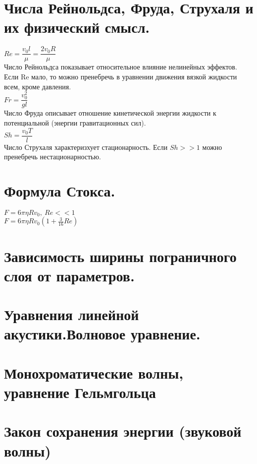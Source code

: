 \begin{multicols*}{4}
		\section{Числа Рейнольдса, Фруда, Струхаля и их физический смысл.}
		$Re=\dfrac{v_0l}{\mu}=\dfrac{2v_0R}{\mu}$ \\
		Число Рейнольдса показывает относительное влияние нелинейных эффектов. Если Re мало, то можно пренебречь в уравнении движения вязкой жидкости всем, кроме давления. \\
		$Fr=\dfrac{v_0^2}{gl}$ \\
		Число Фруда описывает отношение кинетической энергии жидкости к потенциальной (энергии гравитационных сил). \\
		$Sh=\dfrac{v_0T}{l}$ \\
		Число Струхаля характеризхует стационарность. Если $Sh >> 1$ можно пренебречь нестационарностью.
		
		\section{Формула Стокса.}
		$F=6\pi\eta Rv_0,~Re << 1$ \\
		$F=6\pi\eta Rv_0\left(1+\frac{3}{16}Re\right)$
		
		\section{Зависимость ширины пограничного слоя от параметров.}
		\section{Уравнения линейной акустики.Волновое уравнение.}
		\section{Монохроматические волны, уравнение Гельмгольца}
		\section{Закон сохранения энергии (звуковой волны)}
	\end{multicols*}
